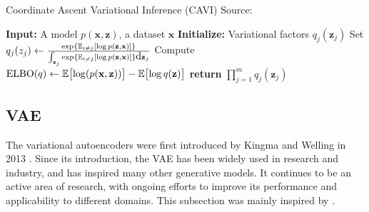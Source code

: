 \begin{algorithm}
    \caption[CAVI algorithm]{Coordinate Ascent Variational Inference (CAVI) Source: \cite{intro-variational-blog-2019}}
    \label{alg:cavi}
    \begin{algorithmic}[1]
      \State \textbf{Input:} A model $p(\mathbf{x},\mathbf{z})$, a dataset $\mathbf{x}$
      \State \textbf{Initialize:} Variational factors $q_j(\mathbf{z}_j)$
          \State Set $q_j(z_j) \gets \frac{\exp{\operatorname{\mathbb{E}}_{i \neq j} [\log p(\mathbf{z},\mathbf{x})]}}{\int_{\mathbf{z}_j}\exp{\operatorname{\mathbb{E}}_{i \neq j} [\log p(\mathbf{z},\mathbf{x})]}\mbox{\rm d}\mathbf{z}_j}$
        \EndFor
        \State Compute $\mathrm{ELBO}(q) \gets \operatorname{\mathbb{E}} \bigl[\log(p(\mathbf{x},\mathbf{z}))\bigr] - \operatorname{\mathbb{E}} \bigl[ \log q(\mathbf{z}) \bigr]$
      \EndWhile
      \State \textbf{return} $\prod_{j=1}^m q_j(\mathbf{z}_j)$
    \end{algorithmic}
\end{algorithm}

\subsection{VAE}
\label{subsec:vaes}
The variational autoencoders were first introduced by Kingma and Welling in 2013 \cite{vae-original-2013}. Since its introduction, the VAE 
has been widely used in research and industry, and has inspired many other generative models. It continues to be an active area of research, with 
ongoing efforts to improve its performance and applicability to different domains. This subsection was mainly inspired by \cite{intro-vae-2019}.

